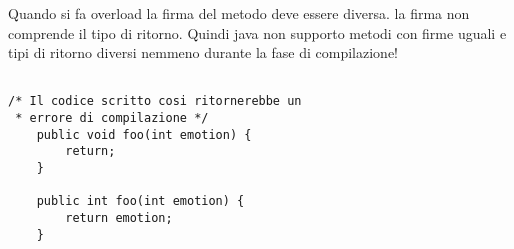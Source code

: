 \noindent Quando si fa overload la firma del metodo deve essere diversa. la firma non comprende il tipo di ritorno. Quindi java non supporto metodi con firme uguali e tipi di ritorno diversi nemmeno durante la fase di compilazione!
\begin{lstlisting}

/* Il codice scritto cosi ritornerebbe un 
 * errore di compilazione */
	public void foo(int emotion) {
		return;
	}   
	
	public int foo(int emotion) {
		return emotion;
	}   
\end{lstlisting}